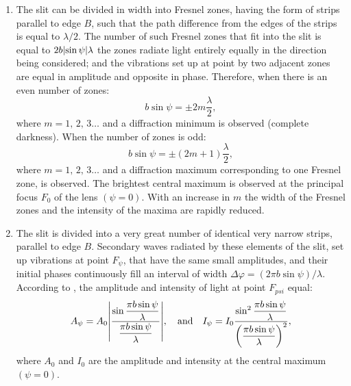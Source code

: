 \begin{enumerate}[label = (\alph*)]
\item {} The slit can be divided in width into Fresnel zones, having the form of strips parallel to edge $B$, such that the path difference from the edges of the strips is equal to $\lambda /2$. The number of such Fresnel zones that fit into the slit is equal to $2 b \abs{\sin \psi} \lambda$ the zones radiate light entirely equally in the direction being considered; and the vibrations set up at point by two adjacent zones are equal in amplitude and opposite in phase. Therefore, when there is an even number of zones:
\begin{equation*}%
b \sin \psi = \pm 2 m \frac{\lambda}{2},
\end{equation*}
 where $m = 1,\,2, \, 3 \dots{}$ and a diffraction minimum is observed (complete darkness). When the number of zones is odd:
\begin{equation*}%
b \sin \psi = \pm (2 m + 1 ) \frac{\lambda}{2},
\end{equation*}
 where $m = 1,\,2, \, 3 \dots{}$ and a diffraction maximum corresponding to one Fresnel zone, is observed. The brightest central maximum is observed at the principal focus $F_{0}$ of the lens $(\psi = 0)$. With an increase in $m$ the width of the Fresnel zones and the intensity of the maxima are rapidly reduced.
\item {} The slit is divided into a very great number of identical very narrow strips, parallel to edge $B$. Secondary waves radiated by these elements of the slit, set up vibrations at point $F_{\psi}$, that have the same small amplitudes, and their initial phases continuously fill an interval of width $\Delta \varphi = (2\pi b \sin \psi)/\lambda$. According to , the amplitude and
intensity of light at point $F_{psi}$ equal:
\begin{equation*}
A_{\psi} = A_{0} \abs{\frac{\sin \dfrac{\pi b \sin \psi}{\lambda}}{\dfrac{\pi b \sin \psi}{\lambda}}}, \qand  I_{\psi} = I_{0} \frac{\sin^{2} \dfrac{\pi b \sin \psi}{\lambda}}{\left(\dfrac{\pi b \sin \psi}{\lambda}\right)^{2}},
\end{equation*}
where $A_{0}$ and $I_{0}$ are the amplitude and intensity at the central maximum $(\psi = 0)$. 


\end{enumerate}
